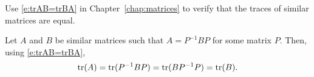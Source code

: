 \documentclass{ximera}
\begin{document}
\begin{exercise} \label{c6.5.2}
Use \eqref{e:trAB=trBA} in Chapter~\ref{chap:matrices} to verify that the
traces of similar matrices are equal.

\begin{solution}

Let $A$ and $B$ be similar matrices such that $A = P^{-1}BP$ for some
matrix $P$.  Then, using \eqref{e:trAB=trBA},
\[ {\rm tr}(A) = {\rm tr}(P^{-1}BP) = {\rm tr}(BP^{-1}P) = {\rm tr}(B). \]

\end{solution}
\end{exercise}
\end{document}
